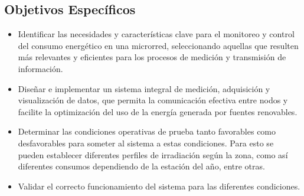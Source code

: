 \subsection{Objetivos Específicos}

\begin{itemize}
    \item Identificar las necesidades y características clave para el monitoreo y control del consumo energético en una microrred, seleccionando aquellas que resulten más relevantes y eficientes para los procesos de medición y transmisión de información.

    \item Diseñar e implementar un sistema integral de medición, adquisición y visualización de datos, que permita la comunicación efectiva entre nodos y facilite la optimización del uso de la energía generada por fuentes renovables.

    \item Determinar las condiciones operativas de prueba tanto favorables como desfavorables para someter al sistema a estas condiciones. Para esto se pueden establecer diferentes perfiles de irradiación según la zona, como así diferentes consumos dependiendo de la estación del año, entre otras.

    \item Validar el correcto funcionamiento del sistema para las diferentes condiciones.

\end{itemize}


